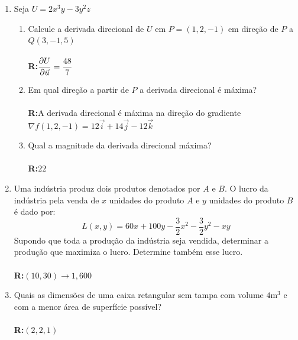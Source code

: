 \documentclass[oneside,a4paper,12pt]{article}
\newcommand{\R}{\\{\bf R:}}
\begin{document}
\begin{enumerate}
\begin{enumerate}
        \end{enumerate}
    \item Seja $U=2x^3y-3y^2z$
        \begin{enumerate}
            \item Calcule a derivada direcional de $U$ em $P=(1,2,-1)$ em direção de $P$ a $Q(3,-1,5)$\\\R $\displaystyle \pdv{U}{\vec{u}}(1,2,-1)=\frac{48}{7}$
            \item Em qual direção a partir de $P$ a derivada direcional é máxima?\\\R A derivada direcional é máxima na direção do gradiente $\nabla f(1,2,-1)=12\vec{i}+14\vec{j}-12\vec{k}$
            \item Qual a magnitude da derivada direcional máxima?\\\R $22$
        \end{enumerate}
    \item Uma indústria produz dois produtos denotados por $A$ e $B$. O lucro da indústria pela venda de $x$ unidades do produto $A$ e $y$ unidades do produto $B$ é dado por: $$L(x,y) = 60x+100y-\frac{3}{2}x^2-\frac{3}{2}y^2-xy$$ Supondo que toda a produção da indústria seja vendida, determinar a  produção que maximiza o lucro. Determine também esse lucro. \\\R $(10,30)\rightarrow 1,600$
    \item Quais as dimensões de uma caixa retangular sem tampa com volume $4$m$^3$ e com a menor área de superfície possível? \\\R$(2,2,1)$
    

\end{enumerate}
\end{document}
